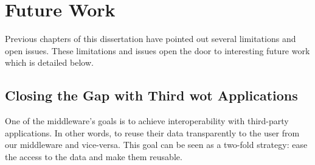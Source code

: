 \section{Future Work}


Previous chapters of this dissertation have pointed out several limitations and open issues.
These limitations and issues open the door to interesting future work which is detailed below.


\subsection{Closing the Gap with Third \acs{wot} Applications}

One of the middleware's goals is to achieve interoperability with third-party applications.
In other words, to reuse their data transparently to the user from our middleware and vice-versa.
This goal can be seen as a two-fold strategy: ease the access to the data and make them reusable.

